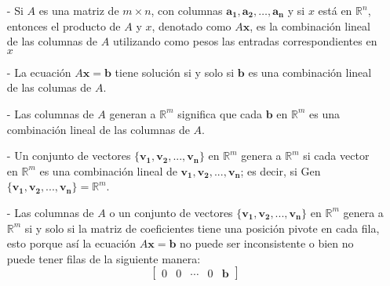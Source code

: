 \documentclass{article}
\begin{document}
\begin{tcolorbox}[colback=red!10!white, colframe=red!70!black, title=Resumen]
    \begin{itemize}
        \item[-] Si $A$ es una matriz de $m \times n$, con columnas $\mathbf{a_1},\mathbf{a_2},\dots, \mathbf{a_n}$ y si $x$ está en $\mathbb{R}^n$, entonces el producto de $A$ y $x$, denotado como $A\mathbf{x}$, es la combinación lineal de las columnas de $A$ utilizando como pesos las entradas correspondientes en $x$
        \item[-] La ecuación $A\mathbf{x} = \mathbf{b}$ tiene solución si y solo si $\mathbf{b}$ es una combinación lineal de las columas de $A$.
        \item[-] Las columnas de $A$ generan a $\mathbb{R}^m$ significa que cada $\mathbf{b}$ en $\mathbb{R}^m$ es una combinación lineal de las columnas de $A$.
        \item[-] Un conjunto de vectores $\{\mathbf{v_1}, \mathbf{v_2},..., \mathbf{v_n}\}$ en $\mathbb{R}^m$ genera a $\mathbb{R}^m$ si cada vector en $\mathbb{R}^m$ es una combinación lineal de $\mathbf{v_1}, \mathbf{v_2},..., \mathbf{v_n}$; es decir, si Gen$\{\mathbf{v_1}, \mathbf{v_2},..., \mathbf{v_n}\} = \mathbb{R}^m$.
        \item[-] Las columnas de $A$ o un conjunto de vectores $\{\mathbf{v_1}, \mathbf{v_2},..., \mathbf{v_n}\}$ en $\mathbb{R}^m$ genera a $\mathbb{R}^m$ si y solo si la matriz de coeficientes tiene una posición pivote en cada fila, esto porque así la ecuación $A\mathbf{x} = \mathbf{b}$ no puede ser inconsistente o bien no puede tener filas de la siguiente manera: $$\begin{bmatrix}
            0 & 0 & \dotsb & 0 &  \mathbf{b} 
        \end{bmatrix}$$
    \end{itemize}
\end{tcolorbox}


\end{document}
